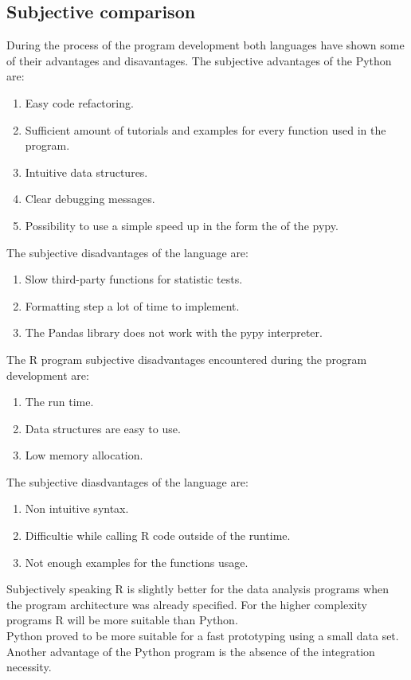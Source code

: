 \documentclass [twoside,
  11pt, a4paper,
  footinclude=true,
  headinclude=true,
  cleardoublepage=empty
]{article}
\begin{document}
\subsection{Subjective comparison}
During the process of the program development both languages have shown some of their advantages and disavantages. The subjective advantages of the Python are:
\begin{enumerate}
    \item Easy code refactoring.
    \item Sufficient amount of tutorials and examples for every function used in the program.
    \item Intuitive data structures.
    \item Clear debugging messages.
    \item Possibility to use a simple speed up in the form the of the pypy.
\end{enumerate}
The subjective disadvantages of the language are:
\begin{enumerate}
    \item Slow third-party functions for statistic tests.
    \item Formatting step a lot of time to implement.
    \item The Pandas library does not work with the pypy interpreter.
\end{enumerate} 
The R program subjective disadvantages encountered during the program development are:
\begin{enumerate}
    \item The run time.
    \item Data structures are easy to use.
    \item Low memory allocation.
\end{enumerate}
The subjective diasdvantages of the language are:
\begin{enumerate}
    \item Non intuitive syntax.
    \item Difficultie while calling R code outside of the runtime.
    \item Not enough examples for the functions usage.
\end{enumerate} 
Subjectively speaking R is slightly better for the data analysis programs when the program architecture was already specified. For the higher complexity programs R will be more suitable than Python.\\ 
Python proved to be more suitable for a fast prototyping using a small data set. Another advantage of the Python program is the absence of the integration necessity.
  
\end{document}
